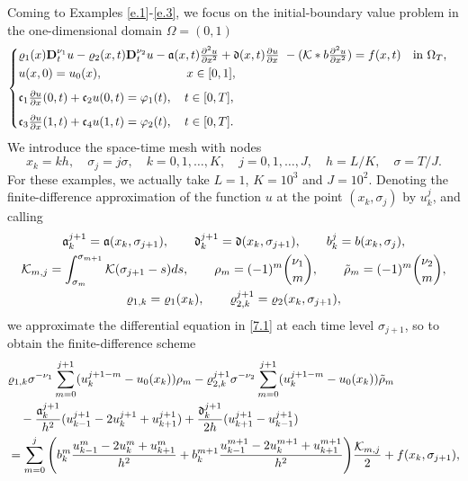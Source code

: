 \documentclass[reqno]{amsart}
\theoremstyle{definition}
\numberwithin{equation}{section}
\begin{document}
\smallskip
Coming to Examples \ref{e.1}-\ref{e.3}, 
we focus on the initial-boundary value problem in the
one-dimensional domain $\Omega=(0,1)$
\begin{equation}
\label{7.1}
\begin{cases}
\varrho_1(x)\mathbf{D}_{t}^{\nu_{1}}u -\varrho_2(x,t)\mathbf{D}_{t}^{\nu_2}u -\mathfrak{a}(x,t)\frac{\partial^{2} u}{\partial x^{2}}+\mathfrak{d}(x,t)
\frac{\partial u}{\partial x}\ -(\mathcal{K}* b\frac{\partial^{2} u}{\partial x^{2}}) = f(x,t)\quad\text{in }\Omega_T,\\
\noalign{\vskip.3mm}
u(x,0)=u_0(x),\qquad\qquad\qquad\quad x\in[0, 1],\\
\noalign{\vskip2mm}
\mathfrak{c}_{1}\frac{\partial u}{\partial x}(0,t)+\mathfrak{c}_{2}u(0,t)=\varphi_{1}(t), \quad t\in[0, T],\\
\noalign{\vskip2mm}
\mathfrak{c}_{3}\frac{\partial u}{\partial x}(1,t)+\mathfrak{c}_{4}u(1,t)=\varphi_{2}(t), \quad t\in[0, T].
\end{cases}
\end{equation}
We introduce the space-time mesh with nodes
$$x_{k}=kh,\quad \sigma_{j}=j\sigma,\quad k=0,1,\ldots, K,
\quad j=0,1,\ldots,  J, \quad h = L/ K, \quad \sigma = T/J.$$
For these examples, we actually take $L=1$, $K=10^{3}$ and $J=10^{2}$.
Denoting the finite-difference approximation of the function $u$ at the point $(x_k, \sigma_j)$ by $u^j_k$, and calling
\begin{gather*}
\mathfrak{a}^{j+1}_k = \mathfrak{a}(x_k, \sigma_{j+1}),\qquad   \mathfrak{d}^{j+1}_k  =   \mathfrak{d}(x_k, \sigma_{j+1}),\qquad
b^j_k = b(x_k, \sigma_j),\\
 \mathcal{K}_{m,j} = \int_{\sigma_m}^{\sigma_{m+1}}{\mathcal{K}}(\sigma_{j+1}-s) d s,\qquad
 \rho_m = (-1)^m\binom{\nu_1}{m},\qquad
 \Tilde\rho_m  = (-1)^m\binom{\nu_2}{m},\\
 \varrho_{1,k} = \varrho_1(x_k),\qquad \varrho^{j+1}_{2,k} = \varrho_{2}(x_k, \sigma_{j+1}),
\end{gather*}
we approximate the differential equation in
\eqref{7.1} at each time level $\sigma_{j+1}$, so to obtain the
finite-difference scheme
\begin{align*}
&  \varrho_{1,k}\sigma^{-\nu_{1}} \sum\limits_{m=0}^{j+1} (u^{j+1-m}_k - u_0(x_k))\rho_m - \varrho_{2,k}^{j+1} \sigma^{-\nu_2} \sum\limits_{m=0}^{j+1} (u^{j+1-m}_k - u_0(x_k))\Tilde\rho_m \\
& \quad- \frac{\mathfrak{a}^{j+1}_k}{h^2}(u^{j+1}_{k-1}-2u^{j+1}_{k}+u^{j+1}_{k+1})
+ \frac{  \mathfrak{d}^{j+1}_k}{2 h}(u^{j+1}_{k+1}-u^{j+1}_{k-1})\\
& = \sum_{m=0}^{j}\left(b^m_k \frac{u^{m}_{k-1}-2 u^{m}_{k}+u^{m}_{k+1}}{h^2}
+ b^{m+1}_k \frac{u^{m+1}_{k-1}-2 u^{m+1}_{k}+u^{m+1}_{k+1}}{h^2}\right)\!\frac{\mathcal{K}_{m,j}}{2}
+ f(x_k,\sigma_{j+1}),
\end{align*}
\end{document}

